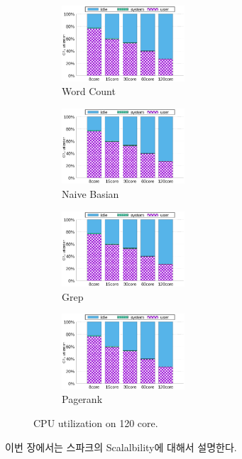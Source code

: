 \begin{figure}[tb]
    \centering
    \begin{subfigure}[b]{0.25\textwidth}
        \includegraphics[width=1.8in]{graph/wc_cpuutils.eps}
        \caption{Word Count}
    \end{subfigure}%
    \begin{subfigure}[b]{0.25\textwidth}
        \includegraphics[width=1.8in]{graph/wc_cpuutils.eps}
        \caption{Naive Basian}
    \end{subfigure}%
    \begin{subfigure}[b]{0.25\textwidth}
        \includegraphics[width=1.8in]{graph/wc_cpuutils.eps}
        \caption{Grep}
    \end{subfigure}%
        \begin{subfigure}[b]{0.25\textwidth}
        \includegraphics[width=1.8in]{graph/wc_cpuutils.eps}
        \caption{Pagerank}
    \end{subfigure}
        \centering
    \caption{CPU utilization on 120 core.}
    \label{fig:utilization2}
\end{figure}


\ifkor
이번 장에서는 스파크의 Scalalbility에 대해서 설명한다.
\else

